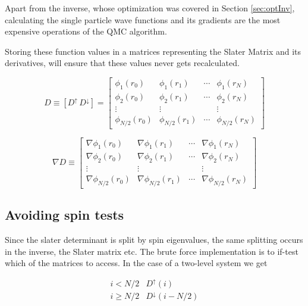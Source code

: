 Apart from the inverse, whose optimization was covered in Section \ref{sec:optInv}, calculating the single particle wave functions and its gradients are the most expensive operations of the QMC algorithm.

Storing these function values in a matrices representing the Slater Matrix and its derivatives, will ensure that these values never gets recalculated. 

\begin{equation}
\label{eq:slaterConcat}
 D  \equiv \left[D^\uparrow\,D^\downarrow\right] = \left[ \begin{array}{cccc}
\phi_1(r_0)     & \phi_1(r_1)     & \cdots & \phi_1(r_N)       \\
\phi_2(r_0)     & \phi_2(r_1)     & \cdots & \phi_2(r_N)       \\
\vdots          & \vdots          &        & \vdots            \\
\phi_{N/2}(r_0) & \phi_{N/2}(r_1) & \cdots & \phi_{N/2}(r_N)   \end{array} \right]
\end{equation}

\begin{equation}
\label{eq:slaterDellConcat}
 \nabla D \equiv \left[ \begin{array}{cccc}
\nabla \phi_1(r_0)     & \nabla \phi_1(r_1)     & \cdots & \nabla \phi_1(r_N)       \\
\nabla \phi_2(r_0)     & \nabla \phi_2(r_1)     & \cdots & \nabla \phi_2(r_N)       \\
\vdots                 & \vdots                 &        & \vdots                   \\
\nabla \phi_{N/2}(r_0) & \nabla \phi_{N/2}(r_1) & \cdots & \nabla \phi_{N/2}(r_N)   \end{array} \right]
\end{equation}

\subsection{Avoiding spin tests}

Since the slater determinant is split by spin eigenvalues, the same splitting occurs in the inverse, the Slater matrix etc. The brute force implementation is to if-test which of the matrices to access. In the case of a two-level system we get

\begin{equation}
\begin{array}{cl}
 i < N/2 & D^\uparrow(i) \\
 i \ge N/2 & D^\downarrow(i - N/2)
\end{array} 
\end{equation}

